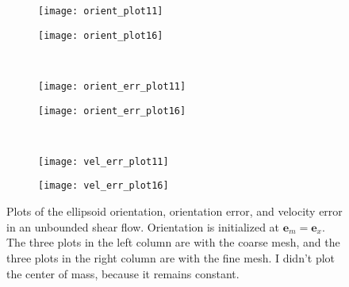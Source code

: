 \documentclass{article}
\newcommand{\vect}[1]{\boldsymbol{\mathbf{#1}}}
\begin{document}
\begin{figure}
  \centering
  \begin{subfigure}{0.49\textwidth}
    \texttt{[image: orient\_plot11]}
  \end{subfigure}
  \hfill
  \begin{subfigure}{0.49\textwidth}
    \texttt{[image: orient\_plot16]}
  \end{subfigure}
  \\
  \begin{subfigure}{0.49\textwidth}
    \texttt{[image: orient\_err\_plot11]}
  \end{subfigure}
  \hfill
  \begin{subfigure}{0.49\textwidth}
    \texttt{[image: orient\_err\_plot16]}
  \end{subfigure}
  \\
  \begin{subfigure}{0.49\textwidth}
    \texttt{[image: vel\_err\_plot11]}
  \end{subfigure}
  \hfill
  \begin{subfigure}{0.49\textwidth}
    \texttt{[image: vel\_err\_plot16]}
  \end{subfigure}
  \caption{Plots of the ellipsoid orientation, orientation error, and
    velocity error in an unbounded shear flow. Orientation is
    initialized at $\vect{e}_m = \vect{e}_x$. The three plots in the
    left column are with the coarse mesh, and the three plots in the
    right column are with the fine mesh. I didn't plot the center of
    mass, because it remains constant.}
  \label{fig:first-free-test}
\end{figure}
\end{document}
